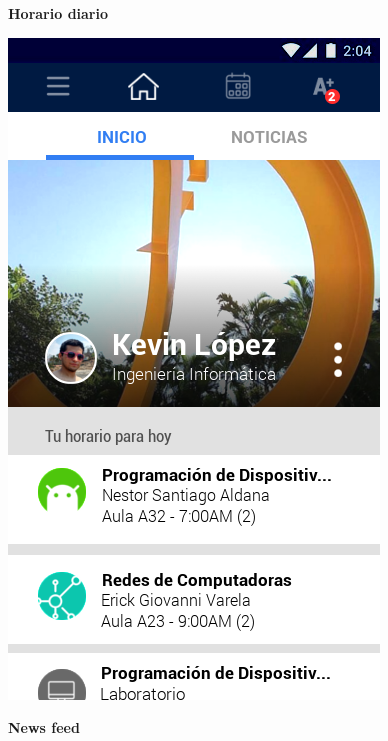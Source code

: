 \documentclass[12pt]{article}
\begin{document}
\begin{figure}[!tbp]
	\centering
	\begin{minipage}[b]{0.45\textwidth}
		\caption{\textbf{Horario diario}}
		\label{fig:horarioDiario}
		\includegraphics[width=\textwidth]{img/2.png}
	\end{minipage}
	\hfill
	\begin{minipage}[b]{0.45\textwidth}
		\caption{\textbf{News feed}}
		\label{fig:newsFeed}

\end{minipage}
\end{figure}
\end{document}
